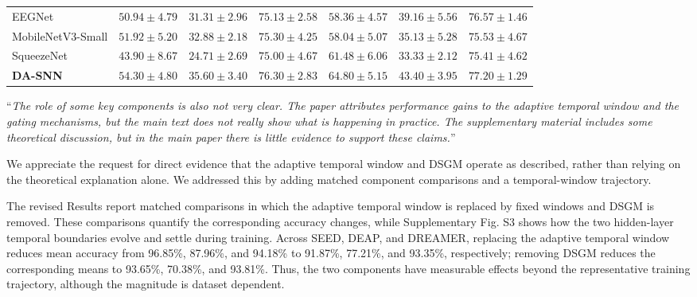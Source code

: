 \documentclass[12pt,technote,onecolumn]{IEEEtran}
\begin{document}
{\begin{minipage}{\linewidth}
\begin{center}
{\begin{tabular}{@{}lcccccc@{}}
EEGNet            & $50.94\pm4.79$ & $31.31\pm2.96$ & $75.13\pm2.58$ & $58.36\pm4.57$ & $39.16\pm5.56$ & $76.57\pm1.46$ \\
MobileNetV3-Small & $51.92\pm5.20$ & $32.88\pm2.18$ & $75.30\pm4.25$ & $58.04\pm5.07$ & $35.13\pm5.28$ & $75.53\pm4.67$ \\
SqueezeNet        & $43.90\pm8.67$ & $24.71\pm2.69$ & $75.00\pm4.67$ & $61.48\pm6.06$ & $33.33\pm2.12$ & $75.41\pm4.62$ \\
\textbf{DA-SNN}  & $\mathbf{54.30\pm4.80}$ & $\mathbf{35.60\pm3.40}$ & $\mathbf{76.30\pm2.83}$ & $\mathbf{64.80\pm5.15}$ & $\mathbf{43.40\pm3.95}$ & $\mathbf{77.20\pm1.29}$ \\
\bottomrule
\end{tabular}%
}
\end{center}
\end{minipage}\par\medskip
}
\EvidenceSuppTableSSeven

\vspace{4mm}

``{\it The role of some key components is also not very clear. The paper
attributes performance gains to the adaptive temporal window and the
gating mechanisms, but the main text does not really show what is
happening in practice. The supplementary material includes some
theoretical discussion, but in the main paper there is little evidence
to support these claims.}''
\vspace{1mm}


We appreciate the request for direct evidence that the adaptive temporal window and DSGM operate as described, rather than relying on the theoretical explanation alone. We addressed this by adding matched component comparisons and a temporal-window trajectory.

The revised Results report matched comparisons in which the adaptive
temporal window is replaced by fixed windows and DSGM is removed. These
comparisons quantify the corresponding accuracy changes, while
Supplementary Fig. S3 shows how the two hidden-layer temporal boundaries
evolve and settle during training. Across SEED, DEAP, and DREAMER, replacing
the adaptive temporal window reduces mean accuracy from 96.85\%, 87.96\%,
and 94.18\% to 91.87\%, 77.21\%, and 93.35\%, respectively; removing DSGM
reduces the corresponding means to 93.65\%, 70.38\%, and 93.81\%. Thus, the
two components have measurable effects beyond the representative training
trajectory, although the magnitude is dataset dependent.
\end{document}
